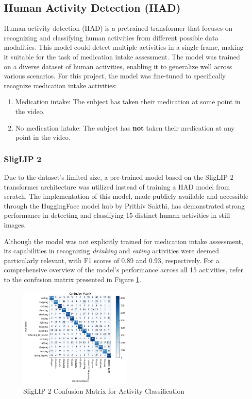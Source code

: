 \documentclass[a4paper,12pt]{article}
\begin{document}
\subsection{Human Activity Detection (HAD)}
Human activity detection (HAD) is a pretrained transformer that focuses on recognizing
and classifying human activities from different possible data modalities. This model could detect multiple activities in a single frame, making it suitable for the task of medication intake assessment. The model was trained on a diverse dataset of human activities, enabling it to generalize well across various scenarios. For this project, the model was fine-tuned to specifically recognize medication intake activities: 
\renewcommand{\labelenumi}{\Roman{enumi}.}
\begin{enumerate}
    \item Medication intake: The subject has taken their medication at some point in the video.
    \item No medication intake: The subject has \textbf{not} taken their medication at any point in the video.
\end{enumerate}

\subsubsection{SligLIP 2}
Due to the dataset's limited size, a pre-trained model based on the SligLIP 2
transformer architecture was utilized instead of training a HAD model from scratch.
The implementation of this model, made publicly available and accessible through the
HuggingFace model hub by Prithiv Sakthi, has demonstrated strong performance
in detecting and classifying 15 distinct human activities in still images.

Although the model was not explicitly trained for medication intake assessment, its
capabilities in recognizing \textit{drinking} and \textit{eating} activities were
deemed particularly relevant, with F1 scores of 0.89 and 0.93, respectively. For a
comprehensive overview of the model's performance across all 15 activities, refer to
the confusion matrix presented in Figure
\ref{fig:HAD-cm}.

\begin{figure}[H]
    \centering
    \includegraphics[width=0.5\textwidth]{./images/conf matrix had.png} 
    \caption{SligLIP 2 Confusion Matrix for Activity Classification}
    \label{fig:HAD-cm}
\end{figure}
\end{document}
